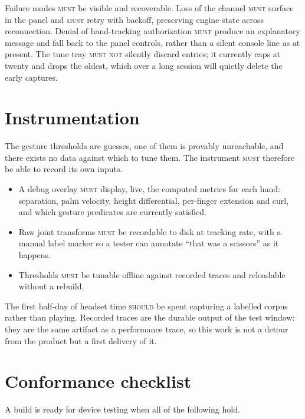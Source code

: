 \documentclass[11pt,a4paper]{article}
\newcommand{\MUST}{\textsc{must}}
\newcommand{\MUSTNOT}{\textsc{must not}}
\newcommand{\SHOULD}{\textsc{should}}
\theoremstyle{definition}
\theoremstyle{plain}
\theoremstyle{remark}
\begin{document}
Failure modes \MUST{} be visible and recoverable. Loss of the channel \MUST{} surface in the panel
and \MUST{} retry with backoff, preserving engine state across reconnection. Denial of hand-tracking
authorization \MUST{} produce an explanatory message and fall back to the panel controls, rather
than a silent console line as at present. The tune tray \MUSTNOT{} silently discard entries; it
currently caps at twenty and drops the oldest, which over a long session will quietly delete the
early captures.

\section{Instrumentation}
\label{sec:instrumentation}

The gesture thresholds are guesses, one of them is provably unreachable, and there exists no data
against which to tune them. The instrument \MUST{} therefore be able to record its own inputs.

\begin{itemize}[leftmargin=*]
\item A debug overlay \MUST{} display, live, the computed metrics for each hand: separation, palm
      velocity, height differential, per-finger extension and curl, and which gesture predicates are
      currently satisfied.
\item Raw joint transforms \MUST{} be recordable to disk at tracking rate, with a manual label
      marker so a tester can annotate ``that was a scissors'' as it happens.
\item Thresholds \MUST{} be tunable offline against recorded traces and reloadable without a
      rebuild.
\end{itemize}

The first half-day of headset time \SHOULD{} be spent capturing a labelled corpus rather than
playing. Recorded traces are the durable output of the test window: they are the same artifact as a
performance trace, so this work is not a detour from the product but a first delivery of it.

\section{Conformance checklist}

A build is ready for device testing when all of the following hold.
\end{document}
